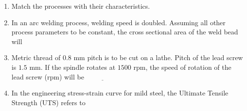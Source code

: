 \documentclass[journal]{IEEEtran}
\begin{document}
\begin{enumerate}[leftmargin=0pt]
    \item Match the processes with their characteristics.
\begin{table}[h]
    \centering
    
\end{table}
\hfill{}
    \begin{enumerate}
    \end{enumerate}

    \item In an arc welding process, welding speed is doubled. Assuming all other process parameters to be constant, the cross sectional area of the weld bead will
    \hfill{}
    \begin{enumerate}
    \end{enumerate}

    \item Metric thread of $0.8$ mm pitch is to be cut on a lathe. Pitch of the lead screw is $1.5$ mm. If the spindle rotates at $1500$ rpm, the speed of rotation of the lead screw (rpm) will be $\underline{\hspace{2cm}}$
    \hfill{}

    \item In the engineering stress-strain curve for mild steel, the Ultimate Tensile Strength (UTS) refers to
    \hfill{}
    \begin{enumerate}
    \end{enumerate}


\end{enumerate}
\end{document}
